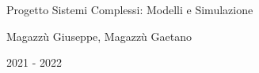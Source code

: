 \documentclass[titlepage]{article}
\begin{document}
\begin{center}
    \Large{Progetto Sistemi Complessi: Modelli e Simulazione}

    {Magazzù Giuseppe, Magazzù Gaetano}

    {2021 - 2022}
\end{center}

\newpage


\tableofcontents

\clearpage
{}







\printbibliography
\end{document}

